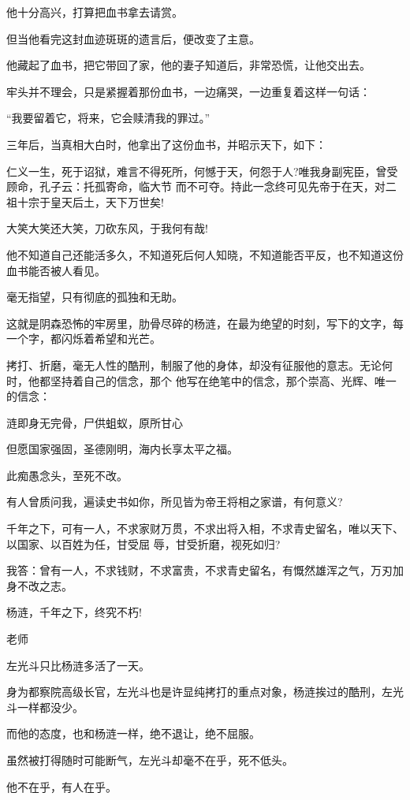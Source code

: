 \documentclass[11pt,a4paper,onecolumn]{article}
\begin{document}
他十分高兴，打算把血书拿去请赏。

但当他看完这封血迹斑斑的遗言后，便改变了主意。

他藏起了血书，把它带回了家，他的妻子知道后，非常恐慌，让他交出去。

牢头并不理会，只是紧握着那份血书，一边痛哭，一边重复着这样一句话：

``我要留着它，将来，它会赎清我的罪过。''

三年后，当真相大白时，他拿出了这份血书，并昭示天下，如下：

仁义一生，死于诏狱，难言不得死所，何憾于天，何怨于人?唯我身副宪臣，曾受顾命，孔子云：托孤寄命，临大节
而不可夺。持此一念终可见先帝于在天，对二祖十宗于皇天后土，天下万世矣!

大笑大笑还大笑，刀砍东风，于我何有哉!

他不知道自己还能活多久，不知道死后何人知晓，不知道能否平反，也不知道这份血书能否被人看见。

毫无指望，只有彻底的孤独和无助。

这就是阴森恐怖的牢房里，肋骨尽碎的杨涟，在最为绝望的时刻，写下的文字，每一个字，都闪烁着希望和光芒。

拷打、折磨，毫无人性的酷刑，制服了他的身体，却没有征服他的意志。无论何时，他都坚持着自己的信念，那个
他写在绝笔中的信念，那个崇高、光辉、唯一的信念：

涟即身无完骨，尸供蛆蚁，原所甘心

但愿国家强固，圣德刚明，海内长享太平之福。

此痴愚念头，至死不改。

有人曾质问我，遍读史书如你，所见皆为帝王将相之家谱，有何意义?

千年之下，可有一人，不求家财万贯，不求出将入相，不求青史留名，唯以天下、以国家、以百姓为任，甘受屈
辱，甘受折磨，视死如归?

我答：曾有一人，不求钱财，不求富贵，不求青史留名，有慨然雄浑之气，万刃加身不改之志。

杨涟，千年之下，终究不朽!

老师

左光斗只比杨涟多活了一天。

身为都察院高级长官，左光斗也是许显纯拷打的重点对象，杨涟挨过的酷刑，左光斗一样都没少。

而他的态度，也和杨涟一样，绝不退让，绝不屈服。

虽然被打得随时可能断气，左光斗却毫不在乎，死不低头。

他不在乎，有人在乎。

\section[\thesection]{}
\end{document}
